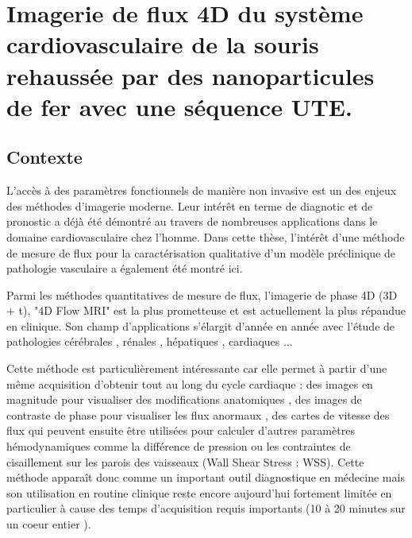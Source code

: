 \chapter{Imagerie de flux 4D du système cardiovasculaire de la souris rehaussée par des nanoparticules de fer avec une séquence UTE.}
\setlength{\footskip}{50pt}
\label{Chap6}
\section{Contexte}

L'accès à des paramètres fonctionnels de manière non invasive est un des enjeux des méthodes d'imagerie moderne. Leur intérêt en terme de diagnotic et de pronostic a déjà été démontré au travers de nombreuses applications dans le domaine cardiovasculaire chez l'homme. Dans cette thèse, l'intérêt d'une méthode de mesure de flux pour la caractérisation qualitative d'un modèle préclinique de pathologie vasculaire a également été montré ici.

Parmi les méthodes quantitatives de mesure de flux, l'imagerie de phase 4D (3D + t), "4D Flow MRI" est la plus prometteuse et est actuellement la plus répandue en clinique. Son champ d'applications s'élargit d'année en année avec l'étude de pathologies cérébrales \cite{meckel2008vivo,hope2010evaluation}, rénales \cite{franccois2011renal}, hépatiques \cite{stankovic2010mr}, cardiaques \cite{geiger20114d,markl2011time} ...

Cette méthode est particulièrement intéressante car elle permet à partir d'une même acquisition d'obtenir tout au long du cycle cardiaque : des images en magnitude pour visualiser des modifications anatomiques  \cite{Eriksson:2013aa}, des images de contraste de phase pour visualiser les flux anormaux \cite{Velikina:2010hc}, des cartes de vitesse des flux \cite{Garcia:2014aa} qui peuvent ensuite être utilisées pour calculer d'autres paramètres hémodynamiques comme la différence de pression \cite{Tyszka:2000aa,bock2011vivo} ou les contraintes de cisaillement sur les parois des vaisseaux (Wall Shear Stress : WSS)\cite{Zhao:2009ng}. Cette méthode apparaît donc comme un important outil diagnostique en médecine mais son utilisation en routine clinique reste encore aujourd'hui fortement limitée en particulier à cause des temps d'acquisition requis importants (10 à 20 minutes sur un coeur entier \cite{Markl:2012pi}).

